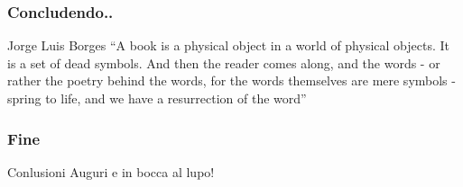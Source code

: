 
    \begin{frame}
        \frametitle{Concludendo..}
        \addtocounter{nframe}{1}
        
    
        \begin{block}{Jorge Luis Borges}
            ``A book is a physical object in a world of physical objects. It is a set of dead symbols. And then the reader comes along, and the words - or rather the poetry behind the words, for the words themselves are mere symbols - spring to life, and we have a resurrection of the word''
        \end{block}
        
    \end{frame}

    \begin{frame}
        \frametitle{Fine}
        \addtocounter{nframe}{1}
    
        \begin{block}{Conlusioni}
            Auguri e in bocca al lupo!
        \end{block}
        
    \end{frame}
